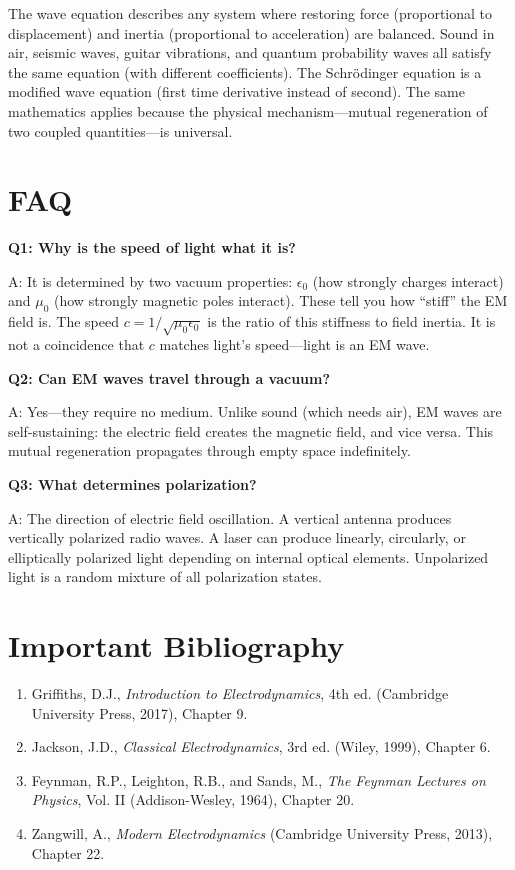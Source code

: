 The wave equation describes any system where restoring force (proportional to displacement) and inertia (proportional to acceleration) are balanced. Sound in air, seismic waves, guitar vibrations, and quantum probability waves all satisfy the same equation (with different coefficients). The Schr\"odinger equation is a modified wave equation (first time derivative instead of second). The same mathematics applies because the physical mechanism---mutual regeneration of two coupled quantities---is universal.


\section*{FAQ}

\textbf{Q1: Why is the speed of light what it is?}

A: It is determined by two vacuum properties: $\epsilon_0$ (how strongly charges interact) and $\mu_0$ (how strongly magnetic poles interact). These tell you how ``stiff'' the EM field is. The speed $c = 1/\sqrt{\mu_0 \epsilon_0}$ is the ratio of this stiffness to field inertia. It is not a coincidence that $c$ matches light's speed---light is an EM wave.

\textbf{Q2: Can EM waves travel through a vacuum?}

A: Yes---they require no medium. Unlike sound (which needs air), EM waves are self-sustaining: the electric field creates the magnetic field, and vice versa. This mutual regeneration propagates through empty space indefinitely.

\textbf{Q3: What determines polarization?}

A: The direction of electric field oscillation. A vertical antenna produces vertically polarized radio waves. A laser can produce linearly, circularly, or elliptically polarized light depending on internal optical elements. Unpolarized light is a random mixture of all polarization states.
\section*{Important Bibliography}

\begin{enumerate}
\item Griffiths, D.J., \textit{Introduction to Electrodynamics}, 4th ed. (Cambridge University Press, 2017), Chapter 9.
\item Jackson, J.D., \textit{Classical Electrodynamics}, 3rd ed. (Wiley, 1999), Chapter 6.
\item Feynman, R.P., Leighton, R.B., and Sands, M., \textit{The Feynman Lectures on Physics}, Vol. II (Addison-Wesley, 1964), Chapter 20.
\item Zangwill, A., \textit{Modern Electrodynamics} (Cambridge University Press, 2013), Chapter 22.
\end{enumerate}


